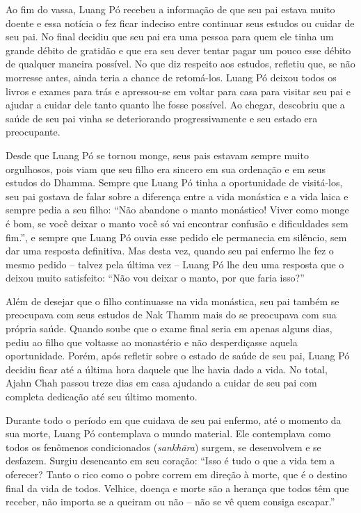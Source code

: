 Ao fim do vassa, Luang Pó recebeu a informação de que seu pai estava
muito doente e essa notícia o fez ficar indeciso entre continuar seus
estudos ou cuidar de seu pai. No final decidiu que seu pai era uma
pessoa para quem ele tinha um grande débito de gratidão e que era seu
dever tentar pagar um pouco esse débito de qualquer maneira possível. No
que diz respeito aos estudos, refletiu que, se não morresse antes, ainda
teria a chance de retomá-los. Luang Pó deixou todos os livros e exames
para trás e apressou-se em voltar para casa para visitar seu pai e
ajudar a cuidar dele tanto quanto lhe fosse possível. Ao chegar,
descobriu que a saúde de seu pai vinha se deteriorando progressivamente
e seu estado era preocupante.

Desde que Luang Pó se tornou monge, seus pais estavam sempre muito
orgulhosos, pois viam que seu filho era sincero em sua ordenação e em
seus estudos do Dhamma. Sempre que Luang Pó tinha a oportunidade de
visitá-los, seu pai gostava de falar sobre a diferença entre a vida
monástica e a vida laica e sempre pedia a seu filho: ``Não abandone o
manto monástico! Viver como monge é bom, se você deixar o manto você só
vai encontrar confusão e dificuldades sem fim.'', e sempre que Luang Pó
ouvia esse pedido ele permanecia em silêncio, sem dar uma resposta
definitiva. Mas desta vez, quando seu pai enfermo lhe fez o mesmo pedido
-- talvez pela última vez -- Luang Pó lhe deu uma resposta que o deixou
muito satisfeito: ``Não vou deixar o manto, por que faria isso?''

Além de desejar que o filho continuasse na vida monástica, seu pai
também se preocupava com seus estudos de Nak Thamm mais do se preocupava
com sua própria saúde. Quando soube que o exame final seria em apenas
alguns dias, pediu ao filho que voltasse ao monastério e não
desperdiçasse aquela oportunidade. Porém, após refletir sobre o estado
de saúde de seu pai, Luang Pó decidiu ficar até a última hora daquele
que lhe havia dado a vida. No total, Ajahn Chah passou treze dias em
casa ajudando a cuidar de seu pai com completa dedicação até seu último
momento.

Durante todo o período em que cuidava de seu pai enfermo, até o momento
da sua morte, Luang Pó contemplava o mundo material. Ele contemplava
como todos os fenômenos condicionados (\emph{sankhāra}) surgem, se
desenvolvem e se desfazem. Surgiu desencanto em seu coração: ``Isso é
tudo o que a vida tem a oferecer? Tanto o rico como o pobre correm em
direção à morte, que é o destino final da vida de todos. Velhice, doença
e morte são a herança que todos têm que receber, não importa se a
queiram ou não -- não se vê quem consiga escapar.''

